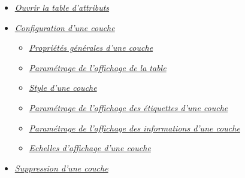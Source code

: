 \documentclass[letterpaper,10pt,french]{sphinxmanual}
\begin{document}
{\begin{minipage}{0.95\linewidth}
\begin{itemize}
\begin{itemize}
\begin{itemize}
\item {} 
\label{maps/layerstree:id12}{\hyperref[maps/layerstree:ouvrir-la-table-d-attributs]{\emph{Ouvrir la table d'attributs}}}

\item {} 
\label{maps/layerstree:id13}{\hyperref[maps/layerstree:configuration-d-une-couche]{\emph{Configuration d'une couche}}}
\begin{itemize}
\item {} 
\label{maps/layerstree:id14}{\hyperref[maps/layerstree:proprietes-generales-d-une-couche]{\emph{Propriétés générales d'une couche}}}

\item {} 
\label{maps/layerstree:id15}{\hyperref[maps/layerstree:parametrage-de-l-affichage-de-la-table]{\emph{Paramétrage de l'affichage de la table}}}

\item {} 
\label{maps/layerstree:id16}{\hyperref[maps/layerstree:style-d-une-couche]{\emph{Style d'une couche}}}

\item {} 
\label{maps/layerstree:id17}{\hyperref[maps/layerstree:parametrage-de-l-affichage-des-etiquettes-d-une-couche]{\emph{Paramétrage de l'affichage des étiquettes d'une couche}}}

\item {} 
\label{maps/layerstree:id18}{\hyperref[maps/layerstree:parametrage-de-l-affichage-des-informations-d-une-couche]{\emph{Paramétrage de l'affichage des informations d'une couche}}}

\item {} 
\label{maps/layerstree:id19}{\hyperref[maps/layerstree:echelles-d-affichage-d-une-couche]{\emph{Echelles d'affichage d'une couche}}}

\end{itemize}

\item {} 
\label{maps/layerstree:id20}{\hyperref[maps/layerstree:suppression-d-une-couche]{\emph{Suppression d'une couche}}}

\end{itemize}

\end{itemize}

\end{itemize}
\end{minipage}}
\begin{center}\setlength{\fboxsep}{5pt}\end{center}
\end{document}
